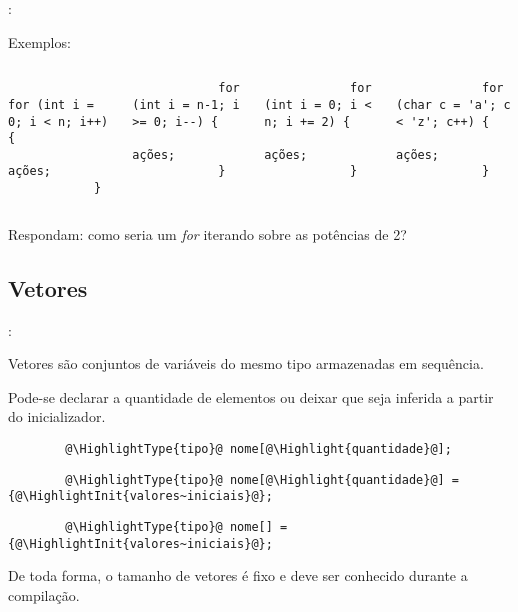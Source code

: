 \begin{frame}[fragile]{\insertsection: \insertsubsection}

	Exemplos:
	\begin{columns}
		\begin{verbatim}
			for (int i = 0; i < n; i++) {
				ações;
			}
		\end{verbatim}
		\begin{verbatim}
			for (int i = n-1; i >= 0; i--) {
				ações;
			}
		\end{verbatim}

		\begin{verbatim}
			for (int i = 0; i < n; i += 2) {
				ações;
			}
		\end{verbatim}
		\begin{verbatim}
			for (char c = 'a'; c < 'z'; c++) {
				ações;
			}
		\end{verbatim}
	\end{columns}

	\vfill
	Respondam: como seria um \emph{for} iterando sobre as potências de 2?

\end{frame}


\subsection{Vetores}


\begin{frame}[fragile]{\insertsection: \insertsubsection}

	Vetores são conjuntos de variáveis do mesmo tipo armazenadas em sequência.

	\bigskip
	Pode-se declarar a quantidade de elementos ou deixar que seja inferida a partir do inicializador.

	\begin{verbatim}
		@\HighlightType{tipo}@ nome[@\Highlight{quantidade}@];
	\end{verbatim}

	\begin{verbatim}
		@\HighlightType{tipo}@ nome[@\Highlight{quantidade}@] = {@\HighlightInit{valores~iniciais}@};
	\end{verbatim}

	\begin{verbatim}
		@\HighlightType{tipo}@ nome[] = {@\HighlightInit{valores~iniciais}@};
	\end{verbatim}

	De toda forma, o tamanho de vetores é fixo e deve ser conhecido durante a compilação.

\end{frame}


